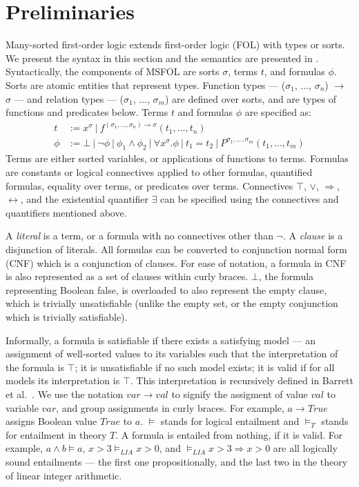 \documentclass{article}
\begin{document}
\section{Preliminaries}
\label{sec:prelims}
	Many-sorted first-order logic extends
	first-order logic (FOL) with 
	types or sorts. We present the 
	syntax in this section and the 
	semantics are presented in
	\cite{Barrett2018}. Syntactically, 
	the components of MSFOL are sorts 
	$\sigma$, terms $t$, and 
	formulas $\phi$. Sorts are 
	atomic entities that 
	represent types. Function types 
	--- ($\sigma_1$, ..., $\sigma_n$) 
	$\to$ $\sigma$ ---
	and relation types 
	--- ($\sigma_1$, ..., $\sigma_m$)
	are defined over sorts, and 
	are types of functions and 
	predicates below. Terms $t$ and 
	formulas $\phi$ are specified as:
	\begin{align*}
		t &:= x^{\sigma}\ |\ 
		f^{(\sigma_1, ..., \sigma_n) \to 
			\sigma}	(t_1, ..., t_n)\\
		\phi &:= \bot\ |\ \neg \phi\ |\ 
		\phi_1 \land \phi_2\ |\ \forall 
		x^{\sigma} . \phi\ |\ t_1 = t_2
		\ |\ P^{\sigma_1,...,\sigma_m}
		(t_1, ..., t_m)
	\end{align*}
	Terms are either sorted variables, 
	or applications of functions to terms.
	Formulas are constants or logical 
	connectives applied to other 
	formulas, quantified formulas, 
	equality over terms, or predicates 
	over terms. Connectives $\top$, $\lor$, 
	$\Rightarrow$, $\leftrightarrow$, and the 
	existential	quantifier $\exists$ 
	can be specified using the connectives 
	and quantifiers mentioned above.
	
	A \textit{literal} is a term, or a 
	formula with no connectives other than 
	$\neg$. A \textit{clause} is a 
	disjunction of literals. All formulas 
	can be converted to conjunction normal 
	form (CNF) which is a conjunction of 
	clauses. For ease of notation, 
	a formula in CNF is also represented
	as a set of clauses within curly 
	braces. $\bot$, the formula 
	representing Boolean false, 
	is overloaded to also represent
	the empty clause, which is trivially
	unsatisfiable (unlike the empty set,
	or the empty conjunction which is 
	trivially satisfiable).
	
	Informally, a formula is satisfiable
	if there exists a satisfying model 
	--- an assignment of well-sorted 
	values to its variables such that 
	the interpretation of the formula 
	is $\top$; it is unsatisfiable if 
	no such model exists; it is valid
	if for all models its interpretation
	is $\top$. This interpretation 
	is recursively defined in 
	Barrett et al.~\cite{Barrett2018}.
	We use the notation 
	$var \to val$ to signify the 
	assigment of value $val$ to 
	variable $var$, and group 
	assignments in curly braces. 
	For example, 
	$a \to True$ assigns Boolean value 
	$True$ to $a$. $\models$ stands for 
	logical entailment and $\models_T$ 
	stands for entailment in theory $T$. 
	A formula is entailed from nothing, 
	if it is valid. For example, 
	$a \land b \models a$,
	$x > 3 \models_{LIA} x > 0$, and 
	$\models_{LIA} x > 3 \Rightarrow 
	x > 0$ are all logically sound 
	entailments --- the first one 
	propositionally, and the
	last two in the theory of linear 
	integer arithmetic.
	
\end{document}
